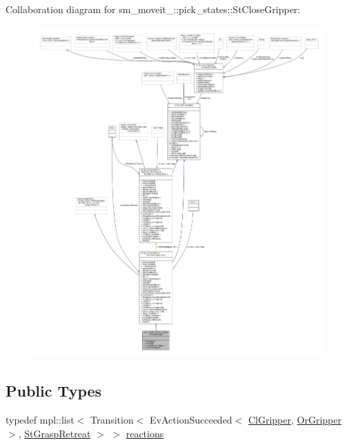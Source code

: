 Collaboration diagram for sm\+\_\+moveit\+\_\+:\+:pick\+\_\+states\+:\+:St\+Close\+Gripper\+:
\nopagebreak
\begin{figure}[H]
\begin{center}
\leavevmode
\includegraphics[width=350pt]{structsm__moveit__4_1_1pick__states_1_1StCloseGripper__coll__graph}
\end{center}
\end{figure}
\subsection*{Public Types}
\begin{DoxyCompactItemize}
\item 
typedef mpl\+::list$<$ Transition$<$ Ev\+Action\+Succeeded$<$ \hyperlink{classsm__moveit__4_1_1cl__gripper_1_1ClGripper}{Cl\+Gripper}, \hyperlink{classsm__moveit__4_1_1OrGripper}{Or\+Gripper} $>$, \hyperlink{structsm__moveit__4_1_1pick__states_1_1StGraspRetreat}{St\+Grasp\+Retreat} $>$ $>$ \hyperlink{structsm__moveit__4_1_1pick__states_1_1StCloseGripper_a6934886ed914236301c2341e96264729}{reactions}
\end{DoxyCompactItemize}
